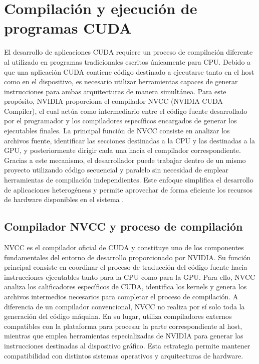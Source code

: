\section{Compilación y ejecución de programas CUDA}

El desarrollo de aplicaciones CUDA requiere un proceso de compilación diferente al utilizado en programas tradicionales escritos únicamente para CPU. Debido a que una aplicación CUDA contiene código destinado a ejecutarse tanto en el host como en el dispositivo, es necesario utilizar herramientas capaces de generar instrucciones para ambas arquitecturas de manera simultánea. Para este propósito, NVIDIA proporciona el compilador NVCC (NVIDIA CUDA Compiler), el cual actúa como intermediario entre el código fuente desarrollado por el programador y los compiladores específicos encargados de generar los ejecutables finales. La principal función de NVCC consiste en analizar los archivos fuente, identificar las secciones destinadas a la CPU y las destinadas a la GPU, y posteriormente dirigir cada una hacia el compilador correspondiente. Gracias a este mecanismo, el desarrollador puede trabajar dentro de un mismo proyecto utilizando código secuencial y paralelo sin necesidad de emplear herramientas de compilación independientes. Este enfoque simplifica el desarrollo de aplicaciones heterogéneas y permite aprovechar de forma eficiente los recursos de hardware disponibles en el sistema \cite{nvccGuide,nvidiaProgrammingGuide,investigacionCUDA}.

\subsection{Compilador NVCC y proceso de compilación}

NVCC es el compilador oficial de CUDA y constituye uno de los componentes fundamentales del entorno de desarrollo proporcionado por NVIDIA. Su función principal consiste en coordinar el proceso de traducción del código fuente hacia instrucciones ejecutables tanto para la CPU como para la GPU. Para ello, NVCC analiza los calificadores específicos de CUDA, identifica los kernels y genera los archivos intermedios necesarios para completar el proceso de compilación. A diferencia de un compilador convencional, NVCC no realiza por sí solo toda la generación del código máquina. En su lugar, utiliza compiladores externos compatibles con la plataforma para procesar la parte correspondiente al host, mientras que emplea herramientas especializadas de NVIDIA para generar las instrucciones destinadas al dispositivo gráfico. Esta estrategia permite mantener compatibilidad con distintos sistemas operativos y arquitecturas de hardware.

